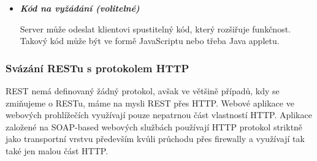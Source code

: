 \documentclass[11pt,twoside,a4paper]{book}
\begin{document}
\begin{itemize}
	\begin{itemize}
 	 \item \textit{HATEOAS (hypermedia as the engine of application state)} –
 	 klienti mohou přejít dynamicky do jiného stavu v aplikaci přes hypermedia
 	 poslané serverem v předchozí odpovědi. Jinými slovy, odpověď od serveru
 	 obsahuje hyperlinky\footnote{Adresa zdroje, na který je možno přejít}, na
 	 které může klient přejít, aby se dostal do jiného stavu v aplikaci.
	  \item \textit{Adresovatelné zdroje} – každý zdroj
	  poskytující informace a data musí být jednoznačně identifikovaný svou
	  URI\footnote{Textový řetězec s definovanou strukturou sloužící pro přesnou
	  specifikaci zdroje informací}.
		\item \textit{Manipulace se zdrojem a jejich reprezentacemi} – pokud se klient nachází na nějakém zdroji, může s ním provádět operace modifikace či smazání.
		\item \textit{Orientace na reprezentaci} – u jedné
		URI lze nastavit, aby dokázala použít odlišné formáty dat, protože ne všechny platformy užívají stejný formát. Například webový
prohlížeč používá HTML a JavaScript, který potřebuje JSON. Java aplikace může
vyžadovat XML.
\end{itemize}

\item\textbf{\textit{Kód na vyžádání (volitelné)}}

Server může odeslat klientovi spustitelný kód, který rozšiřuje funkčnost.
Takový kód může být ve formě JavaScriptu nebo třeba Java appletu.
\end{itemize}

\subsubsection{Svázání RESTu s protokolem HTTP}

REST nemá definovaný žádný protokol, avšak ve většině případů, kdy se zmiňujeme o
RESTu, máme na mysli REST přes HTTP. Webové aplikace ve webových prohlížečích 
využívají pouze nepatrnou část vlastností HTTP. Aplikace založené na SOAP-based
webových službách používají HTTP protokol striktně jako transportní vrstvu
především kvůli průchodu přes firewally a využívají tak také jen malou část HTTP.
\end{document}
